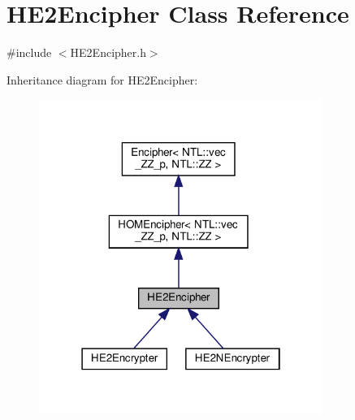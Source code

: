 \hypertarget{classHE2Encipher}{}\section{H\+E2\+Encipher Class Reference}
\label{classHE2Encipher}


{\ttfamily \#include $<$H\+E2\+Encipher.\+h$>$}



Inheritance diagram for H\+E2\+Encipher\+:\nopagebreak
\begin{figure}[H]
\begin{center}
\leavevmode
\includegraphics[width=262pt]{classHE2Encipher__inherit__graph}
\end{center}
\end{figure}


